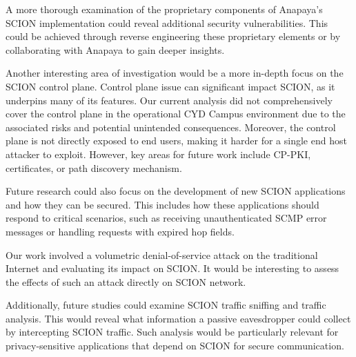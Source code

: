 A more thorough examination of the proprietary components of Anapaya's SCION implementation could reveal additional security vulnerabilities.
This could be achieved through reverse engineering these proprietary elements or by collaborating with Anapaya to gain deeper insights.

Another interesting area of investigation would be a more in-depth focus on the SCION control plane.
Control plane issue can significant impact SCION, as it underpins many of its features.
Our current analysis did not comprehensively cover the control plane in the operational CYD Campus environment due to the associated risks and potential unintended consequences.
Moreover, the control plane is not directly exposed to end users, making it harder for a single end host attacker to exploit.
However, key areas for future work include CP-PKI, certificates, or path discovery mechanism.

Future research could also focus on the development of new SCION applications and how they can be secured.
This includes how these applications should respond to critical scenarios, such as receiving unauthenticated SCMP error messages or handling requests with expired hop fields.

Our work involved a volumetric denial-of-service attack on the traditional Internet and evaluating its impact on SCION.
It would be interesting to assess the effects of such an attack directly on SCION network.

Additionally, future studies could examine SCION traffic sniffing and traffic analysis.
This would reveal what information a passive eavesdropper could collect by intercepting SCION traffic.
Such analysis would be particularly relevant for privacy-sensitive applications that depend on SCION for secure communication.

